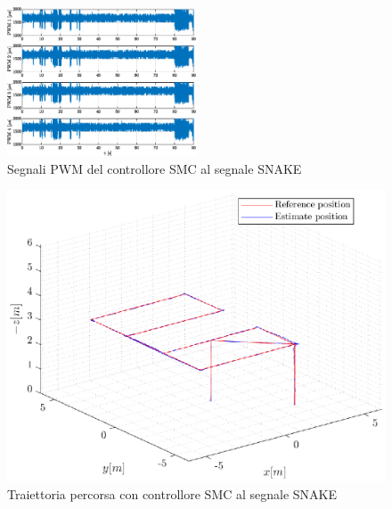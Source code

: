\begin{figure}
	\centering
	\includegraphics[width=0.5\textwidth]{Simulazioni/Figure/SMC/SNAKE/PWM}
	\caption{Segnali PWM del controllore SMC al segnale SNAKE}
\end{figure}
\begin{figure}
	\centering
	\includegraphics[width=1\textwidth]{Simulazioni/Figure/SMC/SNAKE/Trajectory}
	\caption{Traiettoria percorsa con controllore SMC al segnale SNAKE}
\end{figure}

